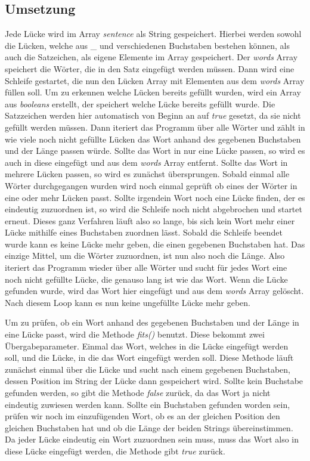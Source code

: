 \documentclass[a4paper, 12pt]{scrartcl}
\begin{document}
\subsection{Umsetzung}
Jede Lücke wird im Array \emph{sentence} als String gespeichert. Hierbei werden sowohl die Lücken, welche aus {\glqq}\_{\grqq} und verschiedenen Buchstaben bestehen können, als auch die Satzeichen, als eigene Elemente im Array gespeichert. Der \emph{words} Array speichert die Wörter, die in den Satz eingefügt werden müssen. Dann wird eine Schleife gestartet, die nun den Lücken Array mit Elementen  aus  dem  \emph{words}  Array  füllen  soll. Um  zu  erkennen  welche  Lücken  bereits  gefüllt  wurden, wird ein Array aus \emph{booleans} erstellt, der speichert welche Lücke bereits gefüllt wurde. Die Satzzeichen werden  hier  automatisch von Beginn an auf \emph{true}  gesetzt,  da  sie  nicht  gefüllt  werden  müssen. Dann iteriert  das  Programm über  alle  Wörter  und zählt in  wie  viele  noch  nicht  gefüllte  Lücken  das  Wort anhand  des  gegebenen  Buchstaben  und  der Länge  passen würde.  Sollte  das  Wort  in  nur  eine  Lücke passen,  so wird es  auch  in  diese eingefügt und aus  dem  \emph{words}  Array  entfernt. Sollte  das  Wort  in mehrere Lücken passen, so wird es zunächst übersprungen. Sobald einmal alle Wörter durchgegangen wurden wird noch einmal geprüft ob eines der Wörter in eine oder mehr Lücken passt. Sollte irgendein Wort  noch  eine  Lücke  finden,  der  es  eindeutig  zuzuordnen  ist,  so  wird  die  Schleife noch  nicht abgebrochen und startet  erneut. Dieses  ganz  Verfahren  läuft  also so  lange,  bis sich  kein Wort  mehr einer Lücke mithilfe eines Buchstaben zuordnen lässt. Sobald die Schleife beendet wurde kann es keine Lücke mehr geben, die einen gegebenen Buchstaben hat. Das einzige Mittel, um die Wörter zuzuordnen, ist nun also noch die Länge. Also iteriert das Programm wieder über alle Wörter und sucht für jedes Wort  eine  noch  nicht  gefüllte  Lücke,  die  genauso  lang  ist  wie  das  Wort.  Wenn  die  Lücke  gefunden wurde, wird das Wort hier eingefügt und aus dem \emph{words} Array gelöscht. Nach diesem Loop kann es nun keine ungefüllte Lücke mehr geben.

Um zu prüfen, ob ein Wort anhand des gegebenen Buchstaben und der Länge in eine Lücke passt, wird die Methode \emph{fits()} benutzt. Diese bekommt zwei Übergabeparameter. Einmal das Wort, welches in die Lücke eingefügt werden soll, und die Lücke, in die das Wort eingefügt werden soll. Diese Methode läuft zunächst  einmal  über  die  Lücke  und sucht nach  einem  gegebenen  Buchstaben,  dessen  Position im String der Lücke dann gespeichert wird. Sollte kein Buchstabe gefunden werden, so gibt die Methode \emph{false} zurück, da das Wort ja nicht eindeutig zuwiesen werden kann. Sollte ein Buchstaben gefunden worden  sein,  prüfen  wir  noch  im  einzufügenden  Wort,  ob  es  an  der  gleichen  Position  den  gleichen Buchstaben  hat  und  ob  die  Länge  der  beiden  Strings  übereinstimmen.  Da  jeder  Lücke  eindeutig ein Wort zuzuordnen sein muss, muss das Wort also in diese Lücke eingefügt werden, die Methode gibt \emph{true} zurück.
\end{document}
